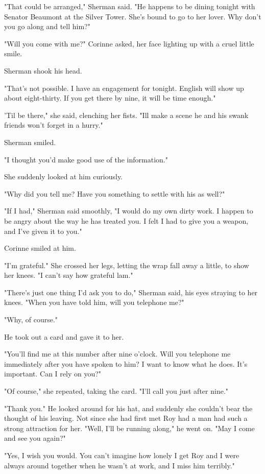 \documentclass{novel}
\begin{document}
"That could be arranged," Sherman said. "He happens to be dining tonight with Senator Beaumont at the Silver Tower. She's bound to go to her lover. Why don't you go along and tell him?"

"Will you come with me?" Corinne asked, her face lighting up with a cruel little smile.

Sherman shook his head.

"That's not possible. I have an engagement for tonight. English will show up about eight-thirty. If you get there by nine, it will be time enough."

'Til be there," she said, clenching her fists. "Ill make a scene he and his swank friends won't forget in a hurry."

Sherman smiled.

"I thought you'd make good use of the information."

She suddenly looked at him curiously.

"Why did you tell me? Have you something to settle with his as well?"

"If I had," Sherman said smoothly, "I would do my own dirty work. I happen to be angry about the way he has treated you. I felt I had to give you a weapon, and I've given it to you."

Corinne smiled at him.

"I'm grateful." She crossed her legs, letting the wrap fall away a little, to show her knees. "I can't say how grateful lam."

"There's just one thing I'd ask you to do," Sherman said, his eyes straying to her knees. "When you have told him, will you telephone me?"

"Why, of course."

He took out a card and gave it to her.

"You'll find me at this number after nine o'clock. Will you telephone me immediately after you have spoken to him? I want to know what he does. It's important. Can I rely on you?"

"Of course," she repeated, taking the card. "I'll call you just after nine."

"Thank you." He looked around for his hat, and suddenly she couldn't bear the thought of his leaving. Not since she had first met Roy had a man had such a strong attraction for her. "Well, I'll be running along," he went on. "May I come and see you again?"

"Yes, I wish you would. You can't imagine how lonely I get Roy and I were always around together when he wasn't at work, and I miss him terribly."
\end{document}
